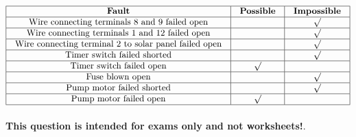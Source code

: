 






$$\vbox{\offinterlineskip
\halign{\strut
\vrule \quad\hfil # \ \hfil & 
\vrule \quad\hfil # \ \hfil & 
\vrule \quad\hfil # \ \hfil \vrule \cr
\noalign{\hrule}
%
{\bf Fault} & {\bf Possible} & {\bf Impossible} \cr
%
\noalign{\hrule}
%
Wire connecting terminals 8 and 9 failed open &  & $\surd$ \cr
%
\noalign{\hrule}
%
Wire connecting terminals 1 and 12 failed open &  & $\surd$ \cr
%
\noalign{\hrule}
%
Wire connecting terminal 2 to solar panel failed open &  & $\surd$ \cr
%
\noalign{\hrule}
%
Timer switch failed shorted &  & $\surd$ \cr
%
\noalign{\hrule}
%
Timer switch failed open & $\surd$ &  \cr
%
\noalign{\hrule}
%
Fuse blown open &  & $\surd$ \cr
%
\noalign{\hrule}
%
Pump motor failed shorted &  & $\surd$ \cr
%
\noalign{\hrule}
%
Pump motor failed open & $\surd$ &  \cr
%
\noalign{\hrule}
} %
}$$ %








{\bf This question is intended for exams only and not worksheets!}.




